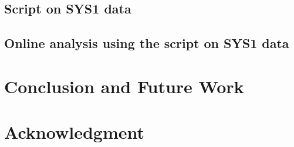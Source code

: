 \documentclass[journal]{IEEEtran}
\begin{document}
\subsection{Script on SYS1 data}\label{sec:Ex:Script}

\subsection{Online analysis using the script on SYS1 data}\label{sec:Ex:ScriptOnline}



\section{Conclusion and Future Work}\label{sec:Concl}


\section*{Acknowledgment}\label{sec:Ack}




\end{document}
